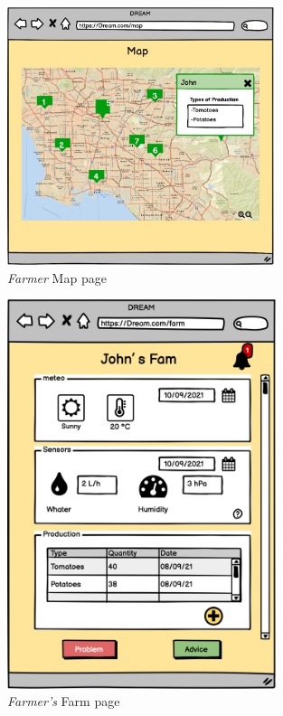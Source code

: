 \begin{figure}[H]
    \begin{center}
    \includegraphics[width=0.7\textwidth]{mocups/FMap.png}
    \caption{\emph{Farmer } Map page}
    \label{fig:farmerMap}
    \end{center}
\end{figure}

\begin{figure}[H]
    \begin{center}
    \includegraphics[width=0.7\textwidth]{mocups/FFarm.png}
    \caption{\emph{Farmer's} Farm page}
    \label{fig:FarmPage}
    \end{center}
\end{figure}

